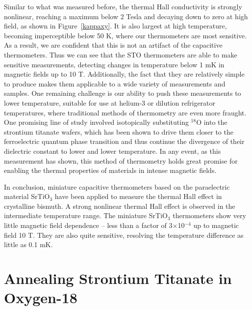 \documentclass{thesis-umich}
\begin{document}
Similar to what was measured before\cite{Kobayashi2012}, the thermal Hall
conductivity is strongly nonlinear, reaching a maximum below 2 Tesla and
decaying down to zero at high field, as shown in Figure~\ref{kappaxy}.  It is
also largest at high temperature, becoming imperceptible below 50 K, where our
thermometers are most sensitive.  As a result, we are confident that this is not
an artifact of the capacitive thermometers. Thus we can see that the STO
thermometers are able to make sensitive measurements, detecting changes in
temperature below 1 mK in magnetic fields up to 10 T. Additionally, the fact
that they are relatively simple to produce makes them applicable to a wide
variety of measurements and samples. One remaining challenge is our ability to
push these measurements to lower temperature, suitable for use at helium-3 or
dilution refrigerator temperatures, where traditional methods of thermometry are
even more fraught\cite{Heine1998, Goodrich1998}. One promising line of study
involved isotopically substituting $^{18}$O into the strontium titanate wafers,
which has been shown\cite{Rowley2014} to drive them closer to the ferroelectric
quantum phase transition and thus continue the divergence of their dielectric
constant to lower and lower temperature. In any event, as this measurement has
shown, this method of thermometry holds great promise for enabling the thermal
properties of materials in intense magnetic fields.

In conclusion, miniature capacitive thermometers based on the paraelectric
material SrTiO$_3$ have been applied to measure the thermal Hall effect in
crystalline bismuth. A strong nonlinear thermal Hall effect is observed in the
intermediate temperature range. The miniature SrTiO$_3$ thermometers show very
little magnetic field dependence -- less than a factor of 3$\times$10$^{-4}$ up
to magnetic field 10 T. They are also quite sensitive, resolving the temperature
difference as little as 0.1 mK.

\section{Annealing Strontium Titanate in Oxygen-18}
\end{document}
